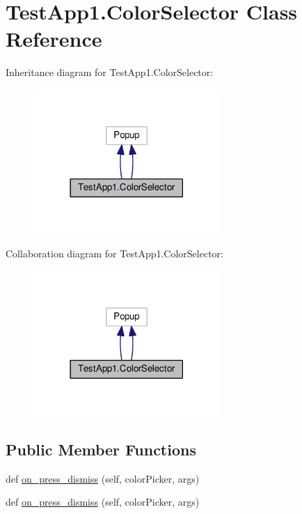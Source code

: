 \hypertarget{classTestApp1_1_1ColorSelector}{}\section{Test\+App1.\+Color\+Selector Class Reference}
\label{classTestApp1_1_1ColorSelector}


Inheritance diagram for Test\+App1.\+Color\+Selector\+:\nopagebreak
\begin{figure}[H]
\begin{center}
\leavevmode
\includegraphics[width=201pt]{classTestApp1_1_1ColorSelector__inherit__graph}
\end{center}
\end{figure}


Collaboration diagram for Test\+App1.\+Color\+Selector\+:\nopagebreak
\begin{figure}[H]
\begin{center}
\leavevmode
\includegraphics[width=201pt]{classTestApp1_1_1ColorSelector__coll__graph}
\end{center}
\end{figure}
\subsection*{Public Member Functions}
\begin{DoxyCompactItemize}
\item 
def \hyperlink{classTestApp1_1_1ColorSelector_afcecec797d6c063981dd5c29a6b876a3}{on\+\_\+press\+\_\+dismiss} (self, color\+Picker, args)
\item 
def \hyperlink{classTestApp1_1_1ColorSelector_afcecec797d6c063981dd5c29a6b876a3}{on\+\_\+press\+\_\+dismiss} (self, color\+Picker, args)
\end{DoxyCompactItemize}


